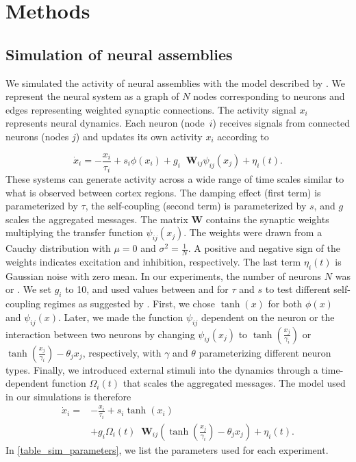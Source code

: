 \documentclass[10pt,twocolumn]{article}
\DeclareMathOperator*{\Agg}{\sum_{j=1}^{N}}
\newcommand\Mat[1]{\ensuremath{\boldsymbol{#1}}}
\begin{document}
\section{Methods}

\subsection*{Simulation of neural assemblies}

We simulated the activity of neural assemblies with the model described by \citet{stern_reservoir_2023}. We represent the neural system as a graph of $N$ nodes corresponding to neurons and edges representing weighted synaptic connections. The activity signal $x_i$ represents neural dynamics. Each neuron (node~$i$) receives signals from connected neurons (nodes $j$) and updates its own activity $x_i$ according to



\begin{equation}
\dot{x}_i=-\frac{x_i}{\tau_i} + s_i\phi\left(x_i\right) + g_i\Agg \Mat{W}_{ij} \psi_{ij}\left(x_j\right) + \eta_i\left(t\right).
\label{eqn:simulation}
\end{equation}
These systems can generate activity across a wide range of time scales similar to what is observed between cortex regions.  The damping effect (first term) is parameterized by $\tau$, the self-coupling (second term) is parameterized by $s$, and $g$ scales the aggregated messages.  The matrix $\Mat{W}$ contains the synaptic weights multiplying the transfer function $\psi_{ij}(x_j)$.  The weights  were drawn from a Cauchy distribution with \mbox{$\mu=0$} and \mbox{$\sigma^2=\frac{1}{N}$}. A positive and negative sign of the weights indicates excitation and inhibition, respectively.  The last term $\eta_i(t)$ is Gaussian noise with zero mean.  In our experiments, the number of neurons $N$ was  or .  We set $g_i$ to 10, and used values between  and  for $\tau$ and $s$ to test different self-coupling regimes as suggested by \citet{stern_dynamics_2014}.  First, we chose $\tanh(x)$ for both $\phi(x)$ and $\psi_{ij}(x)$.  Later, we made the function $\psi_{ij}$ dependent on the neuron or the interaction between two neurons by changing $\psi_{ij}(x_j)$ to $\tanh(\frac{x_j}{\gamma_i})$ or $\tanh(\frac{x_j}{\gamma_i})-\theta_j x_j$, respectively, with $\gamma$ and $\theta$ parameterizing different neuron types. Finally, we introduced external stimuli into the dynamics through a time-dependent function $\Omega_i(t)$ that scales the aggregated messages.  The model used in our simulations is therefore
\begin{equation}
\begin{split}
\dot{x}_i = & -\frac{x_i}{\tau_i} + s_i\tanh\left(x_i\right) \\
& + g_i\Omega_i\left(t\right)\Agg \Mat{W}_{ij} \left(\tanh\left(\frac{x_j}{\gamma_i}\right) - \theta_j x_j\right) + \eta_i\left(t\right).
\label{eqn:simulation2}
\end{split}
\end{equation}
In \cref{table_sim_parameters}, we list the parameters used for each experiment.
\end{document}
